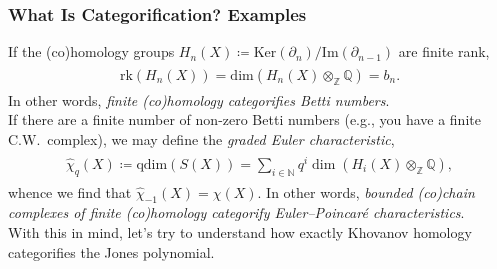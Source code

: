 \documentclass{beamer}
\newcommand*{\emphasis}[1]{\textcolor{structure}{\em #1}}
\begin{document}
\begin{frame}
\frametitle{What Is Categorification? Examples}
If the (co)homology groups $H_n(X) \coloneqq \mathrm{Ker}(\partial_n)/\mathrm{Im}(\partial_{n-1})$ are finite rank,
\begin{align*}
\begin{split}
\mathrm{rk}(H_n(X)) = \mathrm{dim}(H_n(X) \otimes_\mathbb{Z} \mathbb{Q}) = b_n.
\end{split}
\end{align*}
In other words, \emphasis{finite (co)homology categorifies Betti numbers}.\\[2ex]
If there are a finite number of non-zero Betti numbers (e.g., you have a finite C.W.\ complex), we may define the \emphasis{graded Euler characteristic},
\begin{align*}
\begin{split}
\widehat{\chi}_q(X) \coloneqq \mathrm{qdim}(S(X)) = \sum_{i \in \mathbb{N}}{q^i\dim(H_i(X) \otimes_\mathbb{Z} \mathbb{Q})},
\end{split}
\end{align*}
whence we find that $\widehat{\chi}_{-1}(X) = \chi(X)$. In other words, \emphasis{bounded (co)chain complexes of finite (co)homology categorify Euler--Poincar\'{e} characteristics}.\\[2ex]
With this in mind, let's try to understand how exactly Khovanov homology categorifies the Jones polynomial.
\end{frame}


\end{document}
